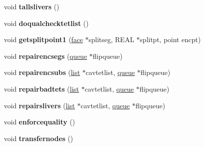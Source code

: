 \begin{DoxyCompactItemize}
void {\bfseries tallslivers} ()
\item 
\mbox{\label{classStemMesh3D_1_1tetgenmesh_aa9c53b4845af2ce37013c047d9efccc8}} 
void {\bfseries doqualchecktetlist} ()
\item 
\mbox{\label{classStemMesh3D_1_1tetgenmesh_ac899b22f955530d994dd4f7a9ff2a415}} 
void {\bfseries getsplitpoint1} (\hyperlink{classStemMesh3D_1_1tetgenmesh_1_1face}{face} $\ast$splitseg, R\+E\+AL $\ast$splitpt, point encpt)
\item 
\mbox{\label{classStemMesh3D_1_1tetgenmesh_a26a281d9f6ec0b2bd67d5f8cc1bfde52}} 
void {\bfseries repairencsegs} (\hyperlink{classStemMesh3D_1_1tetgenmesh_1_1queue}{queue} $\ast$flipqueue)
\item 
\mbox{\label{classStemMesh3D_1_1tetgenmesh_a66e3dc1db05543b6751938b37633f6d8}} 
void {\bfseries repairencsubs} (\hyperlink{classStemMesh3D_1_1tetgenmesh_1_1list}{list} $\ast$cavtetlist, \hyperlink{classStemMesh3D_1_1tetgenmesh_1_1queue}{queue} $\ast$flipqueue)
\item 
\mbox{\label{classStemMesh3D_1_1tetgenmesh_ab75651e18311003777614109a1697a3d}} 
void {\bfseries repairbadtets} (\hyperlink{classStemMesh3D_1_1tetgenmesh_1_1list}{list} $\ast$cavtetlist, \hyperlink{classStemMesh3D_1_1tetgenmesh_1_1queue}{queue} $\ast$flipqueue)
\item 
\mbox{\label{classStemMesh3D_1_1tetgenmesh_a17a947e65096f72a45d182d4441c0af2}} 
void {\bfseries repairslivers} (\hyperlink{classStemMesh3D_1_1tetgenmesh_1_1list}{list} $\ast$cavtetlist, \hyperlink{classStemMesh3D_1_1tetgenmesh_1_1queue}{queue} $\ast$flipqueue)
\item 
\mbox{\label{classStemMesh3D_1_1tetgenmesh_a34cdb64a63111de514eb5643aa1a94c8}} 
void {\bfseries enforcequality} ()
\item 
\mbox{\label{classStemMesh3D_1_1tetgenmesh_a6e74e2aef2e66274be0c5ba2e962a552}} 
void {\bfseries transfernodes} ()
\item 

\end{DoxyCompactItemize}
